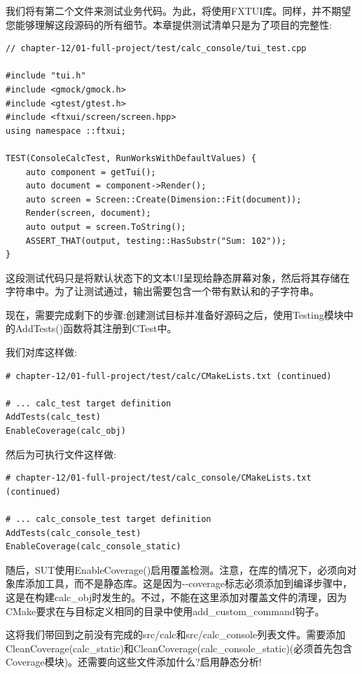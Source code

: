 我们将有第二个文件来测试业务代码。为此，将使用FXTUI库。同样，并不期望您能够理解这段源码的所有细节。本章提供测试清单只是为了项目的完整性:

\begin{lstlisting}[style=styleCXX]
// chapter-12/01-full-project/test/calc_console/tui_test.cpp

#include "tui.h"
#include <gmock/gmock.h>
#include <gtest/gtest.h>
#include <ftxui/screen/screen.hpp>
using namespace ::ftxui;

TEST(ConsoleCalcTest, RunWorksWithDefaultValues) {
	auto component = getTui();
	auto document = component->Render();
	auto screen = Screen::Create(Dimension::Fit(document));
	Render(screen, document);
	auto output = screen.ToString();
	ASSERT_THAT(output, testing::HasSubstr("Sum: 102"));
}
\end{lstlisting}

这段测试代码只是将默认状态下的文本UI呈现给静态屏幕对象，然后将其存储在字符串中。为了让测试通过，输出需要包含一个带有默认和的子字符串。

现在，需要完成剩下的步骤:创建测试目标并准备好源码之后，使用Testing模块中的AddTests()函数将其注册到CTest中。

我们对库这样做:

\begin{lstlisting}[style=styleCMake]
# chapter-12/01-full-project/test/calc/CMakeLists.txt (continued)

# ... calc_test target definition
AddTests(calc_test)
EnableCoverage(calc_obj)
\end{lstlisting}

然后为可执行文件这样做:

\begin{lstlisting}[style=styleCMake]
# chapter-12/01-full-project/test/calc_console/CMakeLists.txt (continued)

# ... calc_console_test target definition
AddTests(calc_console_test)
EnableCoverage(calc_console_static)
\end{lstlisting}

随后，SUT使用EnableCoverage()启用覆盖检测。注意，在库的情况下，必须向对象库添加工具，而不是静态库。这是因为-{}-coverage标志必须添加到编译步骤中，这是在构建calc\_obj时发生的。不过，不能在这里添加对覆盖文件的清理，因为CMake要求在与目标定义相同的目录中使用add\_custom\_command钩子。

这将我们带回到之前没有完成的src/calc和src/calc\_console列表文件。需要添加CleanCoverage(calc\_static)和CleanCoverage(calc\_console\_static)(必须首先包含Coverage模块)。还需要向这些文件添加什么?启用静态分析!

